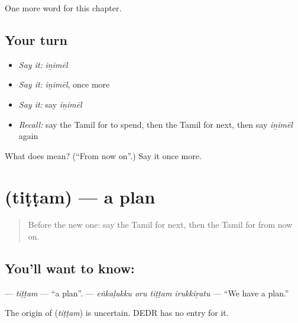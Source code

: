 \begin{grammarlens}[title={What you've built}]
One more word for this chapter.
\end{grammarlens}

\subsection*{Your turn}
\begin{itemize}
\raggedright
  \item \emph{Say it:} \emph{iṉimēl}
  \item \emph{Say it:} \emph{iṉimēl}, once more
  \item \emph{Say it:} say \emph{iṉimēl}
  \item \emph{Recall:} say the Tamil for to spend, then the Tamil for next, then say \emph{iṉimēl} again
\end{itemize}

\begin{tcolorbox}[breakable,colback=teal!4,colframe=teal!35!black,title={Before you move on}]
What does  mean? (\textquotedblleft{}From now on\textquotedblright{}.) Say it once more.
\end{tcolorbox}
\section[\texorpdfstring{\ta{திட்டம்} (tiṭṭam)}{திட்டம் (tiṭṭam)}]{ (tiṭṭam) — a plan}

\label{lesson:TA-C159-tittam}



\begin{quote}
Before the new one: say the Tamil for next, then the Tamil for from now on.
\end{quote}

\subsection*{You'll want to know: }
\textbf{} — \emph{tiṭṭam} — \textquotedblleft{}a plan\textquotedblright{}. \textbf{   } — \emph{eṅkaḷukku oru tiṭṭam irukkiṟatu} — \textquotedblleft{}We have a plan.\textquotedblright{}

\begin{cousinweb}
The origin of \textbf{} (\emph{tiṭṭam}) is uncertain. DEDR has no entry for it.
\end{cousinweb}

